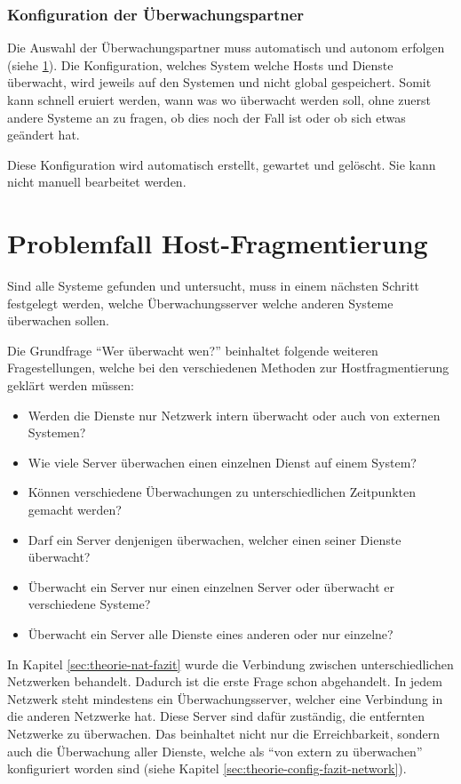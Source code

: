 \subsubsection{Konfiguration der \"Uberwachungspartner} \label{sec:theorie-config-fazit-partner}
Die Auswahl der \"Uberwachungspartner muss automatisch und autonom erfolgen (siehe \ref{sec:theorie-fragmentierung}). Die Konfiguration, welches System welche Hosts und Dienste \"uberwacht, wird jeweils auf den Systemen und nicht global gespeichert. Somit kann schnell eruiert werden, wann was wo \"uberwacht werden soll, ohne zuerst andere Systeme an zu fragen, ob dies noch der Fall ist oder ob sich etwas ge\"andert hat.

Diese Konfiguration wird automatisch erstellt, gewartet und gel\"oscht. Sie kann nicht manuell bearbeitet werden.


\section{Problemfall Host-Fragmentierung} \label{sec:theorie-fragmentierung}
Sind alle Systeme gefunden und untersucht, muss in einem n\"achsten Schritt festgelegt werden, welche \"Uberwachungsserver welche anderen Systeme \"uberwachen sollen.

Die Grundfrage "`Wer \"uberwacht wen?"' beinhaltet folgende weiteren Fragestellungen, welche bei den verschiedenen Methoden zur Hostfragmentierung gekl\"art werden m\"ussen:
\begin{itemize}
 \item Werden die Dienste nur Netzwerk intern \"uberwacht oder auch von externen Systemen?
 \item Wie viele Server \"uberwachen einen einzelnen Dienst auf einem System?
 \item K\"onnen verschiedene \"Uberwachungen zu unterschiedlichen Zeitpunkten gemacht werden?
 \item Darf ein Server denjenigen \"uberwachen, welcher einen seiner Dienste \"uberwacht?
 \item \"Uberwacht ein Server nur einen einzelnen Server oder \"uberwacht er verschiedene Systeme?
 \item \"Uberwacht ein Server alle Dienste eines anderen oder nur einzelne?
\end{itemize}

In Kapitel \ref{sec:theorie-nat-fazit} wurde die Verbindung zwischen unterschiedlichen Netzwerken behandelt. Dadurch ist die erste Frage schon abgehandelt. In jedem Netzwerk steht mindestens ein \"Uberwachungsserver, welcher eine Verbindung in die anderen Netzwerke hat. Diese Server sind daf\"ur zust\"andig, die entfernten Netzwerke zu \"uberwachen. Das beinhaltet nicht nur die Erreichbarkeit, sondern auch die \"Uberwachung aller Dienste, welche als "`von extern zu \"uberwachen"' konfiguriert worden sind (siehe Kapitel \ref{sec:theorie-config-fazit-network}).

